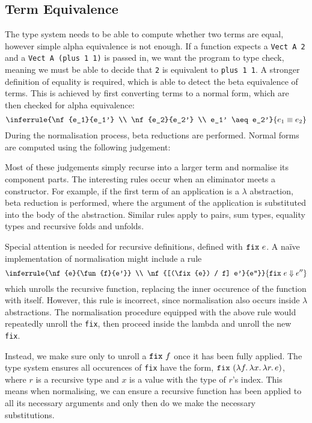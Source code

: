 \documentclass[12pt,a4paper,twoside]{report}
\begin{document}
\subsection{Term Equivalence}

The type system needs to be able to compute whether two terms are equal, however simple alpha equivalence is not enough.
If a function expects a \lstinline{Vect A 2} and a \lstinline{Vect A (plus 1 1)} is passed in, we want the program to type check, meaning we must be able to decide that \lstinline{2} is equivalent to \lstinline{plus 1 1}.
A stronger definition of equality is required, which is able to detect the beta equivalence of terms.
This is achieved by first converting terms to a normal form, which are then checked for alpha equivalence:
\[
    \inferrule{\nf{e_1}{e_1'} \\ \nf{e_2}{e_2'} \\ e_1' \aeq e_2'} {e_1 \equiv e_2}
\]
During the normalisation process, beta reductions are performed.
Normal forms are computed using the following judgement:

\norm{}

Most of these judgements simply recurse into a larger term and normalise its component parts.
The interesting rules occur when an eliminator meets a constructor.
For example, if the first term of an application is a \(\lambda\) abstraction, beta reduction is performed, where the argument of the application is substituted into the body of the abstraction.
Similar rules apply to pairs, sum types, equality types and recursive folds and unfolds.

Special attention is needed for recursive definitions, defined with \(\mathtt{fix}\ e\).
A na\"ive implementation of normalisation might include a rule
\[
    \inferrule{\nf{e}{\fun{f}{e'}} \\ \nf{[(\fix{e}) / f] e'}{e''}} {\nf{\fix{e}}{e''}}
\]
which unrolls the recursive function, replacing the inner occurence of the function with itself.
However, this rule is incorrect, since normalisation also occurs inside \(\lambda\) abstractions.
The normalisation procedure equipped with the above rule would repeatedly unroll the \texttt{fix}, then proceed inside the lambda and unroll the new \texttt{fix}.

Instead, we make sure only to unroll a \(\mathtt{fix}\ f\) once it has been fully applied.
The type system ensures all occurences of \texttt{fix} have the form, \(\mathtt{fix}\ (\lambda f \ldotp \lambda x \ldotp \lambda r \ldotp e)\), where \(r\) is a recursive type and \(x\) is a value with the type of \(r\)'s index.
This means when normalising, we can ensure a recursive function has been applied to all its necessary arguments and only then do we make the necessary substitutions.
\end{document}
